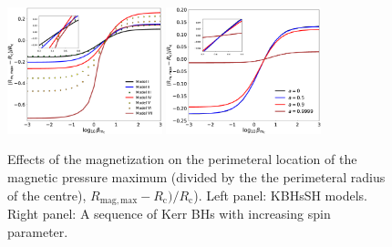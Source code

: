 \documentclass[twocolumn,aps,showpacs,showkeys,prd,superscriptaddress,byrevtex, amsmath]{revtex4-1}
\begin{document}
\begin{figure}
\centering
\includegraphics[width=0.4\textwidth]{figures/fig8_HBH.eps}
\hspace{0.5cm}
\includegraphics[width=0.4\textwidth]{figures/fig8_Kerr.eps}
\hspace{0.5cm}
\caption{Effects of the magnetization on the perimeteral location of the magnetic pressure maximum (divided by the the perimeteral radius of the centre), $R_{\mathrm{mag}, \mathrm{max}} - R_{\mathrm{c}})/ R_{\mathrm{c}}$). Left panel: KBHsSH models. Right panel: A sequence of Kerr BHs with increasing spin parameter.}
\label{comparison_HBH_Kerr_r_m_max}
\end{figure}
\end{document}
